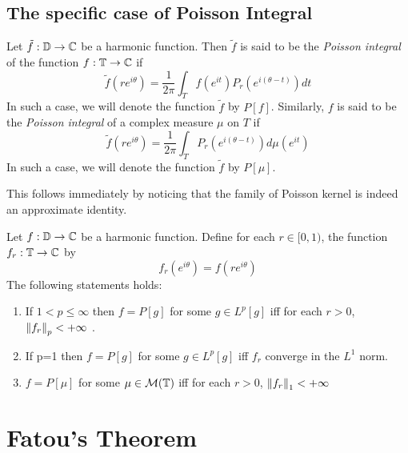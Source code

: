\subsection{The specific case of Poisson Integral}

\begin{definition}
    Let $\tilde{f} : \mathbb D \to \mathbb C$ be a harmonic function. Then $\tilde{f}$ is said to be the \textit{Poisson integral} of the function $f : \mathbb T \to \mathbb C$ if
    \begin{equation*}
	\tilde{f} (re^{i\theta}) = \frac{1}{2\pi} \int_{T} f\left( e^{it} \right) P_{r} \left( e^{i\left( \theta-t \right)} \right) dt
    \end{equation*}
    In such a case, we will denote the function $\tilde{f}$ by $P[f]$.
    Similarly, $f$ is said to be the \textit{Poisson integral} of a complex measure $\mu$ on $T$ if
\begin{equation*}
    \tilde{f} (re^{i\theta}) = \frac{1}{2\pi} \int_{T} P_{r} \left( e^{i\left( \theta-t \right)} \right) d\mu\left( e^{it} \right)
    \end{equation*}In such a case, we will denote the function $\tilde{f}$ by $P[\mu]$.
    \label{def:Poisson-Integral-Of-Some-Function-Or-Measure}
\end{definition}

This follows immediately by noticing that the family of Poisson kernel is indeed an approximate identity. 
\begin{theorem}
    Let $f : \mathbb D \to \mathbb C$ be a harmonic function. Define for each $r\in [0,1)$, the function $f_{r} : \mathbb T \to \mathbb C$ by
    \begin{equation*}
	f_{r} \left( e^{i\theta} \right) = f\left( re^{i\theta} \right)
    \end{equation*}
    The following statements holds:
    \begin{enumerate}
	\item If $1 < p \le \infty$ then $f=P[g]$ for some $g \in L^{p} [g]$ iff for each $r > 0$, $\left\lVert f_{r} \right\rVert_{p} < +\infty$ .
	\item If p=1 then $f=P[g]$ for some $g \in L^{p} [g]$ iff $f_{r}$ converge in the $L^{1}$ norm.
	\item $f=P[\mu]$ for some $\mu \in {\cal M} (\mathbb T)$ iff for each $r > 0$, $\left\lVert f_{r} \right\rVert_{1} < +\infty$ 
    \end{enumerate}
    \label{thm:convergence-Poisson}
\end{theorem}
\section{Fatou's Theorem}

